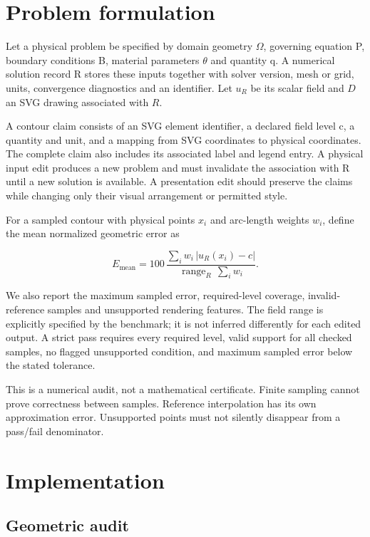 \documentclass[
  11pt,
  a4paper,
]{article}
\begin{document}
\section{Problem formulation}\label{problem-formulation}

Let a physical problem be specified by domain geometry \(\Omega\),
governing equation P, boundary conditions B, material parameters
\(\theta\) and quantity q. A numerical solution record R stores these
inputs together with solver version, mesh or grid, units, convergence
diagnostics and an identifier. Let \(u_R\) be its scalar field and \(D\)
an SVG drawing associated with \(R\).

A contour claim consists of an SVG element identifier, a declared field
level c, a quantity and unit, and a mapping from SVG coordinates to
physical coordinates. The complete claim also includes its associated
label and legend entry. A physical input edit produces a new problem and
must invalidate the association with R until a new solution is
available. A presentation edit should preserve the claims while changing
only their visual arrangement or permitted style.

For a sampled contour with physical points \(x_i\) and arc-length
weights \(w_i\), define the mean normalized geometric error as

\[
E_{\mathrm{mean}} = 100\,\frac{\sum_i w_i\,|u_R(x_i)-c|}{\operatorname{range}_R\,\sum_i w_i}.
\]

We also report the maximum sampled error, required-level coverage,
invalid-reference samples and unsupported rendering features. The field
range is explicitly specified by the benchmark; it is not inferred
differently for each edited output. A strict pass requires every
required level, valid support for all checked samples, no flagged
unsupported condition, and maximum sampled error below the stated
tolerance.

This is a numerical audit, not a mathematical certificate. Finite
sampling cannot prove correctness between samples. Reference
interpolation has its own approximation error. Unsupported points must
not silently disappear from a pass/fail denominator.

\section{Implementation}\label{implementation}

\subsection{Geometric audit}\label{geometric-audit}
\end{document}
